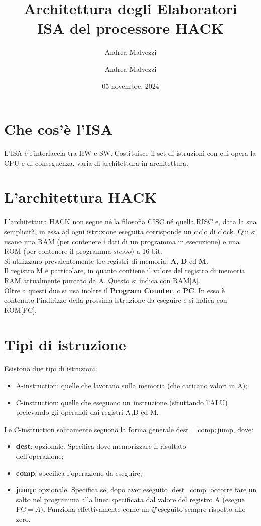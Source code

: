 \documentclass[12pt]{article}
\author{Andrea Malvezzi}
\title{\textbf{Architettura degli Elaboratori\\ ISA del processore HACK}}
\date{05 novembre, 2024}
\author{Andrea Malvezzi}
\begin{document}
\maketitle
\pagebreak
\tableofcontents
\pagebreak

\section{Che cos'è l'ISA}
\label{sec:whats_ISA}
L'ISA è l'interfaccia tra HW e SW.
Costituisce il set di istruzioni con cui opera la CPU e di conseguenza, varia di architettura in architettura.

\section{L'architettura HACK}
\label{sec:HACK_architecture}
L'architettura HACK non segue né la filosofia CISC né quella RISC e, data la sua semplicità, in essa ad ogni istruzione eseguita corrisponde un ciclo di clock.
Qui si usano una RAM (per contenere i dati di un programma in esecuzione) e una ROM (per contenere il programma \textit{stesso}) a 16 bit. \\
Si utilizzano prevalentemente tre registri di memoria: \textbf{A}, \textbf{D} ed \textbf{M}.
\\Il registro M è particolare, in quanto contiene il valore del registro di memoria RAM attualmente puntato da A. Questo si indica con RAM[A]. \\
Oltre a questi due si usa inoltre il \textbf{Program Counter}, o \textbf{PC}. In esso è contenuto l'indirizzo della prossima istruzione da eseguire e si indica con ROM[PC].

\section{Tipi di istruzione}
\label{sec:tipi_istruzione}
Esistono due tipi di istruzioni:
\begin{itemize}
    \item A-instruction: quelle che lavorano sulla memoria (che caricano valori in A);
    \item C-instruction: quelle che eseguono un instruzione (sfruttando l'ALU) prelevando gli operandi dai registri A,D ed M.
\end{itemize}
Le C-instruction solitamente seguono la forma generale $\text{dest} = \text{comp}; \text{jump}$, dove:
\begin{itemize}
    \item \textbf{dest}: opzionale. Specifica dove memorizzare il risultato\\dell'operazione;
    \item \textbf{comp}: specifica l'operazione da eseguire;
    \item \textbf{jump}: opzionale. Specifica se, dopo aver eseguito $\text{dest} = \text{comp}$ occorre fare un salto nel programma alla linea specificata dal valore del registro A (esegue $\text{PC} = A)$. Funziona effettivamente come un \textit{if} eseguito sempre rispetto allo zero. 
\end{itemize}
\end{document}
